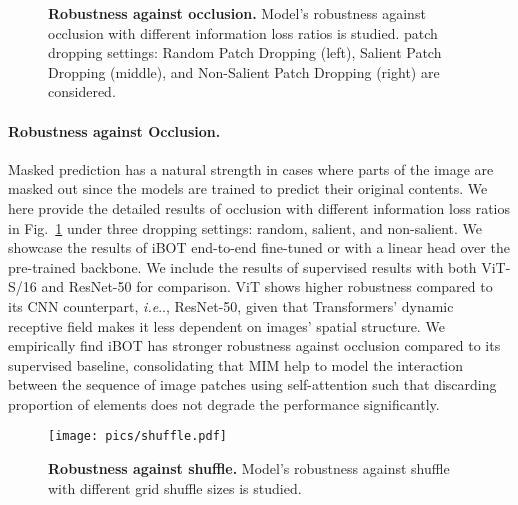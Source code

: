 \documentclass{article} \usepackage{iclr2022_conference,times}
\makeatletter
\def\ourmethod{{iBOT}\xspace}
\DeclareRobustCommand\onedot{\futurelet\@let@token\@onedot}
\def\@onedot{\ifx\@let@token.\else.\null\fi\xspace}
\def\ie{\emph{i.e}\onedot} \def\Ie{\emph{I.e}\onedot}
\makeatother
\begin{document}
\begin{figure}[!tbp]
\centering
{}
\vspace{-0.4cm}
\caption{\textbf{Robustness against occlusion.} Model's robustness against occlusion with different information loss ratios is studied.  patch dropping settings: Random Patch Dropping (left), Salient Patch Dropping (middle), and Non-Salient Patch Dropping (right) are considered. }
\label{fig:robustness}
\end{figure}

\paragraph{Robustness against Occlusion.} 
Masked prediction has a natural strength in cases where parts of the image are masked out since the models are trained to predict their original contents. 
We here provide the detailed results of occlusion with different information loss ratios in Fig.~\ref{fig:robustness} under three dropping settings: random, salient, and non-salient. 
We showcase the results of \ourmethod end-to-end fine-tuned or with a linear head over the pre-trained backbone. We include the results of supervised results with both ViT-S/16 and ResNet-50 for comparison.
ViT shows higher robustness compared to its CNN counterpart, \ie, ResNet-50, given that Transformers' dynamic receptive field makes it less dependent on images' spatial structure. 
We empirically find \ourmethod has stronger robustness against occlusion compared to its supervised baseline, consolidating that MIM help to model the interaction between the sequence of image patches using self-attention such that discarding proportion of elements does not degrade the performance significantly.


\begin{figure}[!tbp]
\centering
\texttt{[image: pics/shuffle.pdf]}
\vspace{-0.4cm}
\caption{\textbf{Robustness against shuffle.} Model's robustness against shuffle with different grid shuffle sizes is studied. }
\label{fig:robustness2}
\vspace{0.2cm}
\end{figure}
\end{document}
